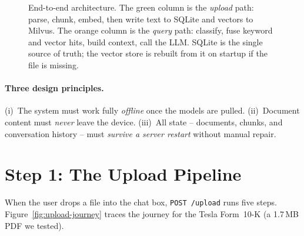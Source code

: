\documentclass[11pt,a4paper]{article}
\begin{document}
\begin{figure}[h]
{%
}
\caption{End-to-end architecture. The \textcolor{green!50!black}{green} column
is the \emph{upload} path: parse, chunk, embed, then write text to SQLite and
vectors to Milvus. The \textcolor{orange!70!black}{orange} column is the
\emph{query} path: classify, fuse keyword and vector hits, build context,
call the LLM. SQLite is the single source of truth; the vector store is
rebuilt from it on startup if the file is missing.}
\label{fig:arch}
\end{figure}

\paragraph{Three design principles.}
(i)~The system must work fully \emph{offline} once the models are pulled.
(ii)~Document content must \emph{never} leave the device.
(iii)~All state -- documents, chunks, and conversation history -- must
\emph{survive a server restart} without manual repair.

\section{Step 1: The Upload Pipeline}
\label{sec:upload}

When the user drops a file into the chat box, \texttt{POST /upload} runs
five steps. Figure~\ref{fig:upload-journey} traces the journey for the Tesla
Form~10-K (a 1.7\,MB PDF we tested).
\end{document}
